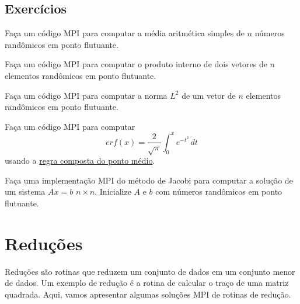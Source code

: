 \subsection* {Exercícios}

\begin{exer}
  Faça um código MPI para computar a média aritmética simples de $n$ números randômicos em ponto flutuante.
\end{exer}

\begin{exer}
  Faça um código MPI para computar o produto interno de dois vetores de $n$ elementos randômicos em ponto flutuante.
\end{exer}

\begin{exer}
  Faça um código MPI para computar a norma $L^2$ de um vetor de $n$ elementos randômicos em ponto flutuante.
\end{exer}

\begin{exer}
  Faça um código MPI para computar
  \begin{equation}
    erf(x) = \frac{2}{\sqrt{\pi}}\int_0^x e^{-t^2}\,dt
  \end{equation}
  usando a \href{https://phkonzen.github.io/notas/MatematicaNumerica/cap_integr_sec_int_comp.html}{regra composta do ponto médio}.
\end{exer}

\begin{exer}
  Faça uma implementação MPI do método de Jacobi para computar a solução de um sistema $Ax=b$ $n\times n$. Inicialize $A$ e $b$ com números randômicos em ponto flutuante.
\end{exer}


\section {Reduções} \label {cap_mpi_sec_redu}

Reduções são rotinas que reduzem um conjunto de dados em um conjunto menor de dados. Um exemplo de redução é a rotina de calcular o traço de uma matriz quadrada. Aqui, vamos apresentar algumas soluções MPI de rotinas de redução.

